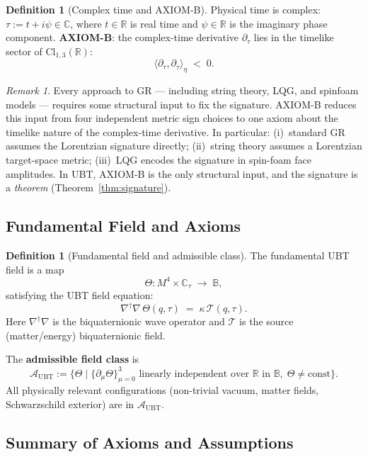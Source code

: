 \documentclass[12pt,a4paper]{article}
\theoremstyle{definition}
\newtheorem{definition}[theorem]{Definition}
\theoremstyle{remark}
\newtheorem{remark}[theorem]{Remark}
\newcommand{\BB}{\mathbb{B}}
\newcommand{\CC}{\mathbb{C}}
\newcommand{\RR}{\mathbb{R}}
\newcommand{\calA}{\mathcal{A}}
\newcommand{\calT}{\mathcal{T}}
\begin{document}
\begin{definition}[Complex time and AXIOM-B]
\label{def:axiomb}
Physical time is complex: $\tau := t + i\psi \in \CC$,
where $t \in \RR$ is real time and $\psi \in \RR$ is the imaginary phase component.
\textbf{AXIOM-B}: the complex-time derivative $\partial_\tau$ lies in the
timelike sector of $\mathrm{Cl}_{1,3}(\RR)$:
\[
  \langle\partial_\tau,\partial_\tau\rangle_\eta \;<\; 0.
\]
\end{definition}

\begin{remark}
Every approach to GR — including string theory, LQG, and spinfoam models —
requires some structural input to fix the signature.
AXIOM-B reduces this input from four independent metric sign choices to one
axiom about the timelike nature of the complex-time derivative.
In particular:
(i)~standard GR assumes the Lorentzian signature directly;
(ii)~string theory assumes a Lorentzian target-space metric;
(iii)~LQG encodes the signature in spin-foam face amplitudes.
In UBT, AXIOM-B is the only structural input, and the signature is a
\emph{theorem} (Theorem~\ref{thm:signature}).
\end{remark}

\subsection{Fundamental Field and Axioms}

\begin{definition}[Fundamental field and admissible class]
\label{def:theta}
The fundamental UBT field is a map
\[
  \Theta : M^4 \times \CC_\tau \;\longrightarrow\; \BB,
\]
satisfying the UBT field equation:
\[
  \nabla^\dagger\nabla\,\Theta(q,\tau) \;=\; \kappa\,\calT(q,\tau).
\]
Here $\nabla^\dagger\nabla$ is the biquaternionic wave operator and
$\calT$ is the source (matter/energy) biquaternionic field.

The \textbf{admissible field class} is
\[
  \calA_{\mathrm{UBT}} :=
  \bigl\{\Theta \;\big|\; \{\partial_\mu\Theta\}_{\mu=0}^3
  \text{ linearly independent over } \RR \text{ in } \BB,\;
  \Theta \neq \mathrm{const}\bigr\}.
\]
All physically relevant configurations (non-trivial vacuum, matter fields,
Schwarzschild exterior) are in $\calA_{\mathrm{UBT}}$.
\end{definition}

\subsection{Summary of Axioms and Assumptions}
\end{document}
